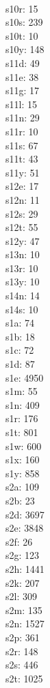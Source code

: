 \begin{multicols}{8}
  \\s10r: 15
  \\s10s: 239
  \\s10t: 10
  \\s10y: 148
  \\s11d: 49
  \\s11e: 38
  \\s11g: 17
  \\s11l: 15
  \\s11n: 29
  \\s11r: 10
  \\s11s: 67
  \\s11t: 43
  \\s11y: 51
  \\s12e: 17
  \\s12n: 11
  \\s12s: 29
  \\s12t: 55
  \\s12y: 47
  \\s13n: 10
  \\s13r: 10
  \\s13y: 10
  \\s14n: 14
  \\s14s: 10
  \\s1a: 74
  \\s1b: 18
  \\s1c: 72
  \\s1d: 87
  \\s1e: 4950
  \\s1m: 55
  \\s1n: 409
  \\s1r: 176
  \\s1t: 801
  \\s1w: 600
  \\s1x: 160
  \\s1y: 858
  \\s2a: 109
  \\s2b: 23
  \\s2d: 3697
  \\s2e: 3848
  \\s2f: 26
  \\s2g: 123
  \\s2h: 1441
  \\s2k: 207
  \\s2l: 309
  \\s2m: 135
  \\s2n: 1527
  \\s2p: 361
  \\s2r: 148
  \\s2s: 446
  \\s2t: 1025

\end{multicols}
